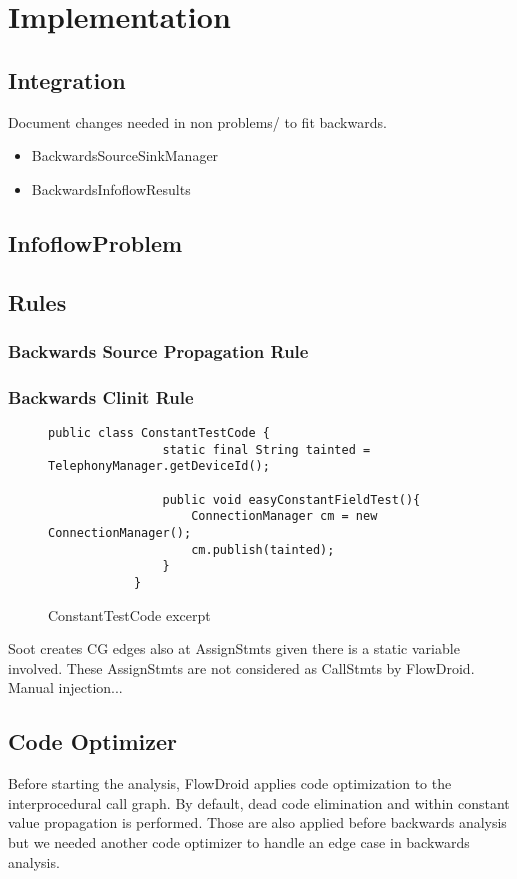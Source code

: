 \documentclass[../draft.tex]{subfiles}
\begin{document}
    \chapter{Implementation}

    \section{Integration}
    Document changes needed in non problems/ to fit backwards.
    \begin{itemize}
        \item BackwardsSourceSinkManager
        \item BackwardsInfoflowResults
    \end{itemize}
    \section{InfoflowProblem}
    \section{Rules}
    \subsection{Backwards Source Propagation Rule}\label{s:sourcerule}
    \subsection{Backwards Clinit Rule}
    \begin{figure}
        \centering
        \begin{lstlisting}[gobble=12]
            public class ConstantTestCode {
                static final String tainted = TelephonyManager.getDeviceId();
    
                public void easyConstantFieldTest(){
                    ConnectionManager cm = new ConnectionManager();
                    cm.publish(tainted);
                }
            }
        \end{lstlisting}
        \caption{ConstantTestCode excerpt}
        \label{lst:ConstantTestCode}
    \end{figure}

    Soot creates CG edges also at AssignStmts given there is a static variable involved. 
    These AssignStmts are not considered as CallStmts by FlowDroid. Manual injection...

    \section{Code Optimizer}
    Before starting the analysis, FlowDroid applies code optimization to the interprocedural call graph. By default, dead code elimination and within constant value propagation is performed. Those are also applied before backwards analysis but we needed another code optimizer to handle an edge case in backwards analysis.
\end{document}
